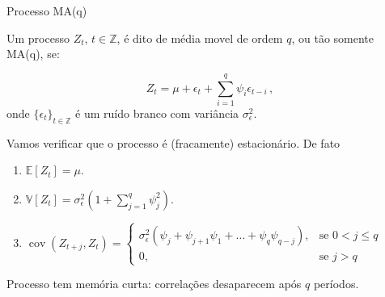 \documentclass[11pt]{beamer}
\newenvironment{halfwideitemize}{\itemize\addtolength{\itemsep}{0.5em}}{\enditemize}
\begin{document}
\begin{frame}{Processo  MA(q)}
	\begin{halfwideitemize}
			\item Um processo $Z_t$, $t \in \mathbb{Z}$, é dito de média movel de ordem $q$, ou tão somente MA(q), se:
			
			$$Z_t = \mu + \epsilon_t + \sum_{i=1}^{q} \psi_i \epsilon_{t-i} \, ,$$
			onde $\{\epsilon_t\}_{t \in \mathbb{Z}}$ é um ruído branco com variância $\sigma^2_\epsilon$.
			\item Vamos verificar que o processo é (fracamente) estacionário. De fato
			\begin{enumerate}
				\item 			$\mathbb{E}[Z_t] = \mu $.
				\item $\mathbb{V}[Z_t] = \sigma^2_\epsilon(1+ \sum_{j=1}^q\psi^2_j)$.
				\item $\operatorname{cov}( Z_{t+j}, Z_t) = \begin{cases}
					\sigma^2_\epsilon (\psi_{j} + \psi_{j+1}\psi_1 + \ldots + \psi_q \psi_{q-j}), & \text{se } 0 < j  \leq q \\
					0,& \text{se } j  > q
				\end{cases}$
			\end{enumerate}
			\item Processo tem memória curta: correlações desaparecem após $q$ períodos.
	\end{halfwideitemize}
\end{frame}
\end{document}
